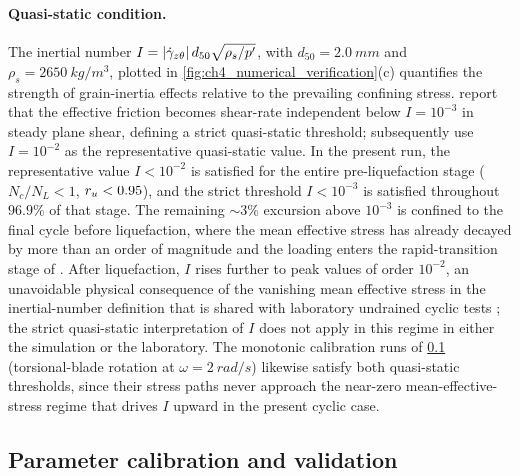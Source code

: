 \documentclass[../main]{subfiles}
\begin{document}
\paragraph{Quasi-static condition.}
The inertial number $I=|\dot\gamma_{z\theta}|\,d_{50}\sqrt{\rho_s/p'}$, with $d_{50}=\SI{2.0}{mm}$ and $\rho_s=\SI{2650}{kg/m^3}$, plotted in \cref{fig:ch4_numerical_verification}(c) quantifies the strength of grain-inertia effects relative to the prevailing confining stress. \citet{GDRMiDi2004} report that the effective friction becomes shear-rate independent below $I = 10^{-3}$ in steady plane shear, defining a strict quasi-static threshold; \citet{daCruzEmam2005} subsequently use $I = 10^{-2}$ as the representative quasi-static value. In the present run, the representative value $I < 10^{-2}$ is satisfied for the entire pre-liquefaction stage ($N_c/N_L < 1$, $r_u < 0.95$), and the strict threshold $I < 10^{-3}$ is satisfied throughout $96.9\%$ of that stage. The remaining $\sim 3\%$ excursion above $10^{-3}$ is confined to the final cycle before liquefaction, where the mean effective stress has already decayed by more than an order of magnitude and the loading enters the rapid-transition stage of \citet{Wang2025inertial}. After liquefaction, $I$ rises further to peak values of order $10^{-2}$, an unavoidable physical consequence of the vanishing mean effective stress in the inertial-number definition that is shared with laboratory undrained cyclic tests \citep{Wang2025inertial}; the strict quasi-static interpretation of $I$ does not apply in this regime in either the simulation or the laboratory. The monotonic calibration runs of \cref{subsec:ch4_calibration} (torsional-blade rotation at $\omega = \SI{2}{rad/s}$) likewise satisfy both quasi-static thresholds, since their stress paths never approach the near-zero mean-effective-stress regime that drives $I$ upward in the present cyclic case.

\subsection{Parameter calibration and validation}
\label{subsec:ch4_calibration}
\end{document}
